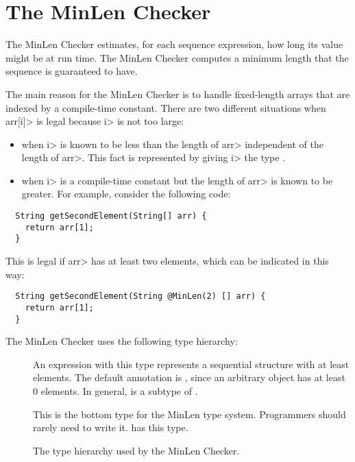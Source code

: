 \section{The MinLen Checker\label{index-minlen}}

The MinLen Checker estimates, for each sequence expression, how long its value
might be at run time.  The MinLen Checker computes a minimum length that
the sequence is guaranteed to have.

The main reason for the MinLen Checker is to handle fixed-length arrays
that are indexed by a compile-time constant.
There are two different situations when \<arr[i]> is legal because \<i> is
not too large:
\begin{itemize}
\item
  when \<i> is known to be less than the length of \<arr> independent of the length of
  \<arr>.  This fact is represented by giving \<i> the type .
\item
  when \<i> is a compile-time constant but the length of \<arr> is known to
  be greater.  For example, consider the following code:
\end{itemize}

\begin{Verbatim}
  String getSecondElement(String[] arr) {
    return arr[1];
  }
\end{Verbatim}
  This is legal if \<arr> has at least two elements, which can be indicated
  in this way:
\begin{Verbatim}
  String getSecondElement(String @MinLen(2) [] arr) {
    return arr[1];
  }
\end{Verbatim}

The MinLen Checker uses the following type hierarchy:

\begin{description}
\item[]
  An expression with this type represents a sequential structure
  with at least  elements.  The default annotation is
  , since an arbitrary object has at least 0 elements.
  In general,  is a subtype of .
\item[]
  This is the bottom type for the MinLen type system.
  Programmers should rarely need to write it.
   has this type.
  \end{description}

\begin{figure}
  \caption{The type hierarchy used by the MinLen Checker.}
  \label{fig-minlen-types}
\end{figure}
